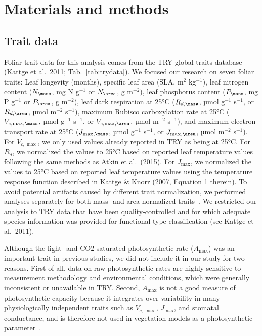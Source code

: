 \section{Materials and methods}\label{sec:mvtraits-methods}

\subsection{Trait data}

Foliar trait data for this analysis comes from the TRY global traits database (Kattge et al.~2011; Tab.~\ref{tab:trydata}). \nocite{kattge_try_2011}
We focused our research on seven foliar traits:
Leaf longevity (months),
specific leaf area (SLA, m$^2$ kg$^{-1}$),
leaf nitrogen content ($N_{\mass}$, mg N g$^{-1}$ or $N_{\area}$, g m$^{-2}$),
leaf phosphorus content ($P_{\mass}$, mg P g$^{-1}$ or $P_{\area}$, g m$^{-2}$),
leaf dark respiration at 25°C ($R_{d,\mass}$, µmol g$^{-1}$ s$^{-1}$, or $R_{d,\area}$, µmol m$^{-2}$ s$^{-1}$),
maximum Rubisco carboxylation rate at 25°C ($V_{c,\max,\mass}$, µmol g$^{-1}$ s$^{-1}$, or $V_{c,\max,\area}$, µmol m$^{-2}$ s$^{-1}$),
and maximum electron transport rate at 25°C ($J_{\max,\mass}$, µmol g$^{-1}$ s$^{-1}$, or $J_{\max,\area}$, µmol m$^{-2}$ s$^{-1}$).
For $V_{c,\max}$, we only used values already reported in TRY as being at 25°C.
For $R_{d}$, we normalized the values to 25°C based on reported leaf temperature values following the same methods as Atkin et al.~(2015). \nocite{atkin_global_2015}
For $J_{\max}$, we normalized the values to 25°C based on reported leaf temperature values using the temperature response function described in Kattge \& Knorr (2007, Equation 1 therein). \nocite{kattge_2007_temperature}
To avoid potential artifacts caused by different trait normalization, we performed analyses separately for both mass- and area-normalized traits~\cite{osnas_global_2013,lloyd_les}.
We restricted our analysis to TRY data that have been quality-controlled and for which adequate species information was provided for functional type classification (see Kattge et al.~2011).\nocite{kattge_try_2011}

Although the light- and CO2-saturated photosynthetic rate ($A_{\max}$) was an important trait in previous studies, we did not include it in our study for two reasons.
First of all, data on raw photosynthetic rates are highly sensitive to measurement methodology and environmental conditions, which were generally inconsistent or unavailable in TRY\@.
Second, $A_{\max}$ is not a good measure of photosynthetic capacity because it integrates over variability in many physiologically independent traits such as $V_{c,\max}$, $J_{\max}$, and stomatal conductance, and is therefore not used in vegetation models as a photosynthetic parameter~\cite{Ali_2015}.

